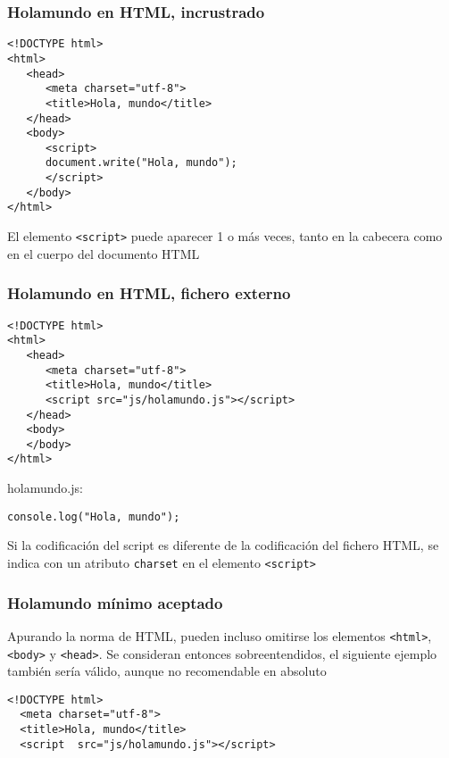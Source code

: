 \documentclass[ucs]{beamer}
\begin{document}
\begin{frame}[fragile]
\frametitle{Holamundo en HTML, incrustrado}
  \begin{scriptsize}
  \begin{verbatim}
<!DOCTYPE html>
<html>
   <head>
      <meta charset="utf-8">
      <title>Hola, mundo</title>
   </head>
   <body>
      <script>
      document.write("Hola, mundo");
      </script>
   </body>
</html>
  \end{verbatim}
  \end{scriptsize}

El elemento
\verb|<script>|
puede aparecer 1 o más veces, tanto en la cabecera como en el cuerpo
del documento HTML

\end{frame}

\begin{frame}[fragile]
\frametitle{Holamundo en HTML, fichero externo}

  \begin{scriptsize}
  \begin{verbatim}
<!DOCTYPE html>
<html>
   <head>
      <meta charset="utf-8">
      <title>Hola, mundo</title>
      <script src="js/holamundo.js"></script>
   </head>
   <body>
   </body>
</html>
  \end{verbatim}
  \end{scriptsize}

holamundo.js:

  \begin{scriptsize}
  \begin{verbatim}
console.log("Hola, mundo");
  \end{verbatim}
  \end{scriptsize}


Si la codificación del script es diferente de la codificación del fichero HTML,
se indica con un atributo \verb|charset| en el elemento 
\verb|<script>|

\end{frame}

\begin{frame}[fragile]
\frametitle{Holamundo mínimo aceptado}

Apurando la norma de HTML, pueden incluso omitirse los 
elementos 
\verb|<html>|,
\verb|<body>| y
\verb|<head>|. Se consideran entonces sobreentendidos, el siguiente ejemplo
también sería válido, aunque no recomendable en absoluto


  \begin{scriptsize}
  \begin{verbatim}
<!DOCTYPE html>
  <meta charset="utf-8">
  <title>Hola, mundo</title>
  <script  src="js/holamundo.js"></script>
  \end{verbatim}
  \end{scriptsize}
\end{frame}
\end{document}
